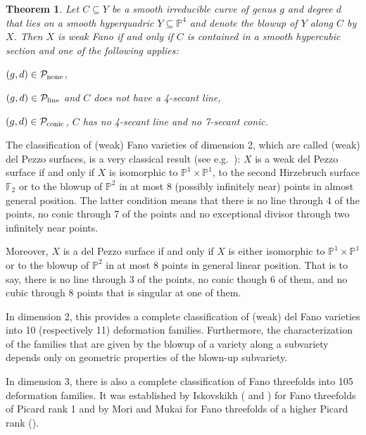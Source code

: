 \documentclass[english,11pt,reqno]{amsart}
\newcommand{\sub}{\subseteq}
\newcommand{\Ptwo}{\mathbb{P}^2}
\newcommand{\Pfour}{\mathbb{P}^4}
\newcommand{\PxP}{\mathbb{P}^1 \times \mathbb{P}^1}
\newcommand{\Ftwo}{\mathbb{F}_2}
\newtheorem{mythm}{Theorem}
\begin{document}
	\begin{mythm} \label{thm:B}
		Let $C \sub Y$ be a smooth irreducible curve of genus $g$ and degree $d$ that lies on a smooth hyperquadric $Y \sub \Pfour$ and denote the blowup of $Y$ along $C$ by $X$. Then $X$ is weak Fano if and only if $C$ is contained in a smooth hypercubic section and one of the following applies:
		\begin{enummythm}
			\item $(g,d) \in \mathcal{P}_{\textup{none}}$, \label{thm:B_no_secants}
			\item $(g,d)\in \mathcal{P}_{\textup{line}}$ and $C$ does not have a 4-secant line, \label{thm:B_4_secant_line}
			\item $(g,d)\in \mathcal{P}_{\textup{conic}}$, $C$ has no 4-secant line and no 7-secant conic. \label{thm:B_7_secant_conic}
		\end{enummythm}
	\end{mythm}
	The classification of (weak) Fano varieties of dimension 2, which are called (weak) del Pezzo surfaces, is a very classical result (see e.g.\ \cite[Chapter 8.1]{Dolgachev}): $X$ is a weak del Pezzo surface if and only if $X$ is isomorphic to $\PxP$, to the second Hirzebruch surface $\Ftwo$ or to the blowup of $\Ptwo$ in at most 8 (possibly infinitely near) points in almost general position. The latter condition means that there is no line through 4 of the points, no  conic through 7 of the points and no exceptional divisor through two infinitely near points.\par 
	Moreover, $X$ is a del Pezzo surface if and only if $X$ is either isomorphic to $\PxP$ or to the blowup of $\Ptwo$ in at most 8 points in general linear position. That is to say, there is no line through 3 of the points, no conic though 6 of them, and no cubic through 8 points that is singular at one of them. \par 
	In dimension 2, this provides a complete classification of (weak) del Fano varieties into 10 (respectively 11) deformation families. Furthermore, the characterization of the families that are given by the blowup of a variety along a subvariety depends only on geometric properties of the blown-up subvariety. \par 
	In dimension 3, there is also a complete classification of Fano threefolds into 105 deformation families. It was established by Iskovskikh (\cite{Iskovskikh-Fano_threefolds_I} and \cite{Iskovskikh-Fano_threefolds_II}) for Fano threefolds of Picard rank 1 and by Mori and Mukai for Fano threefolds of a higher Picard rank (\cite{Mori_Mukai-Fano_threefolds_Picard_rank_2}). \par
\end{document}

